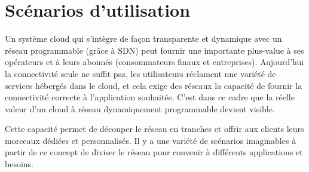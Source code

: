 
\section{Scénarios d'utilisation}

Un système cloud qui s'intègre de façon transparente et dynamique avec un réseau programmable (grâce à SDN) peut fournir une importante plus-value à ses opérateurs et à leurs abonnés (consommateurs finaux et entreprises). Aujourd'hui la connectivité seule ne suffit pas, les utilisateurs réclament une variété de services hébergés dans le cloud, et cela exige des réseaux la capacité de fournir la connectivité correcte à l'application souhaitée. C'est dans ce cadre que  la réelle valeur d'un cloud à réseau dynamiquement programmable  devient visible.

Cette capacité permet de découper le réseau en tranches et offrir aux clients leurs morceaux dédiées et personnalisés. Il y a une variété de scénarios imaginables  à partir de ce concept de diviser le réseau pour convenir à différents applications et besoins.

